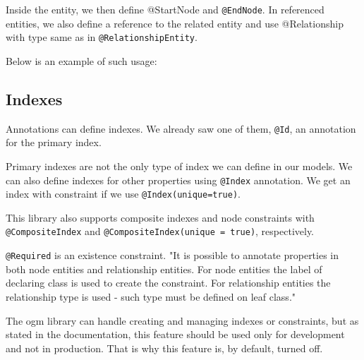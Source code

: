 Inside the entity, we then define @StartNode and \texttt{@EndNode}. In referenced entities, we also define a reference to
the related entity and use @Relationship with type same as in \texttt{@RelationshipEntity}.

Below is an example of such usage:


\subsection {Indexes}

Annotations can define indexes. We already saw one of them, \texttt{@Id}, an annotation for the primary index.

Primary indexes are not the only type of index we can define in our models. We can also define indexes for other
properties using \texttt{@Index} annotation. We get an index with constraint if we use \texttt{@Index(unique=true)}.

This library also supports composite indexes and node constraints with \texttt{@CompositeIndex} and \texttt{@CompositeIndex(unique = true)}, respectively.

\texttt{@Required} is an existence constraint. "It is possible to annotate properties in both node entities and relationship entities. For node entities
the label of declaring class is used to create the constraint. For relationship entities the relationship type is used - such type must
be defined on leaf class." \cite{noauthor_reference_nodate}

The \acrshort{ogm} library can handle creating and managing indexes or constraints, but as stated in the documentation, this feature should be used only for development
and not in production. That is why this feature is, by default, turned off.


